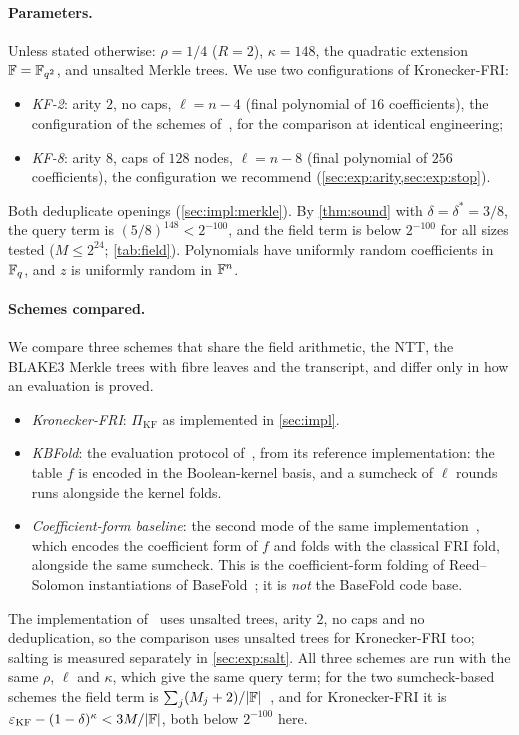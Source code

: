 \paragraph{Parameters.}
Unless stated otherwise: $\rho = 1/4$ ($R = 2$), $\kappa = 148$, the quadratic extension $\mathbb{F} = \mathbb{F}_{q^2}$, and unsalted Merkle trees. We use two configurations of Kronecker-FRI:
\begin{itemize}
  \item \emph{KF-2}: arity $2$, no caps, $\ell = n - 4$ (final polynomial of $16$ coefficients), the configuration of the schemes of~\cite{Mkh26}, for the comparison at identical engineering;
  \item \emph{KF-8}: arity $8$, caps of $128$ nodes, $\ell = n - 8$ (final polynomial of $256$ coefficients), the configuration we recommend (\cref{sec:exp:arity,sec:exp:stop}).
\end{itemize}
Both deduplicate openings (\cref{sec:impl:merkle}).
By \cref{thm:sound} with $\delta = \delta^* = 3/8$, the query term is $(5/8)^{148} < 2^{-100}$, and the field term is below $2^{-100}$ for all sizes tested ($M \le 2^{24}$; \cref{tab:field}).
Polynomials have uniformly random coefficients in $\mathbb{F}_q$, and $z$ is uniformly random in $\mathbb{F}^n$.

\paragraph{Schemes compared.}
We compare three schemes that share the field arithmetic, the NTT, the BLAKE3 Merkle trees with fibre leaves and the transcript, and differ only in how an evaluation is proved.
\begin{itemize}
  \item \emph{Kronecker-FRI}: $\Pi_{\mathrm{KF}}$ as implemented in \cref{sec:impl}.
  \item \emph{KBFold}: the evaluation protocol of~\cite{Mkh26}, from its reference implementation: the table $f$ is encoded in the Boolean-kernel basis, and a sumcheck of $\ell$ rounds runs alongside the kernel folds.
  \item \emph{Coefficient-form baseline}: the second mode of the same implementation~\cite[\S8]{Mkh26}, which encodes the coefficient form of $f$ and folds with the classical FRI fold, alongside the same sumcheck. This is the coefficient-form folding of Reed--Solomon instantiations of BaseFold~\cite{ZCF24}; it is \emph{not} the BaseFold code base.
\end{itemize}
The implementation of~\cite{Mkh26} uses unsalted trees, arity $2$, no caps and no deduplication, so the comparison uses unsalted trees for Kronecker-FRI too; salting is measured separately in \cref{sec:exp:salt}.
All three schemes are run with the same $\rho$, $\ell$ and $\kappa$, which give the same query term; for the two sumcheck-based schemes the field term is $\sum_j (M_j + 2)/|\mathbb{F}|$~\cite{Mkh26}, and for Kronecker-FRI it is $\varepsilon_{\mathrm{KF}} - (1-\delta)^\kappa < 3M/|\mathbb{F}|$, both below $2^{-100}$ here.

